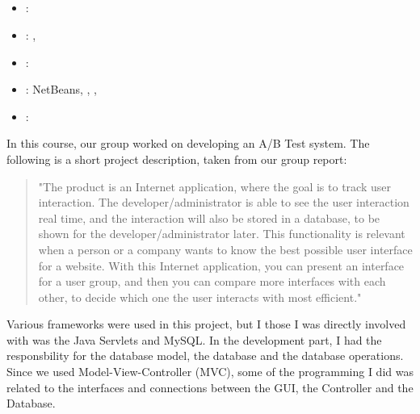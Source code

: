 \subsection[Applied Computer Science Project]{}
\label{sec:appl_comp_sci_proj}
\begin{itemize} 
	\item {}: 
	\item {}: , 
	\item {}: 
	\item {}: NetBeans, , , 
	\item {}: 
\end{itemize} 
In this course, our group worked on developing an A/B Test system. 
The following is a short project description, taken from our group report:
\begin{quote} 
"The product is an Internet application, where the goal is to track user interaction. 
The developer/administrator is able to see the user interaction real time, and the interaction will also be stored in a database, to be shown for the developer/administrator later. 
This functionality is relevant when a person or a company wants to know the best possible user interface for a website.
With this Internet application, you can present an interface for a user group, and then you can compare more interfaces with each other, 
to decide which one the user interacts with most efficient."
\end{quote}
Various frameworks were used in this project, but I those I was directly involved with was the Java Servlets and MySQL. 
In the development part, I had the responsbility for the database model, the database and the database operations. 
Since we used Model-View-Controller (MVC), some of the programming I did was related to the interfaces and connections between the GUI, the Controller and the Database.

